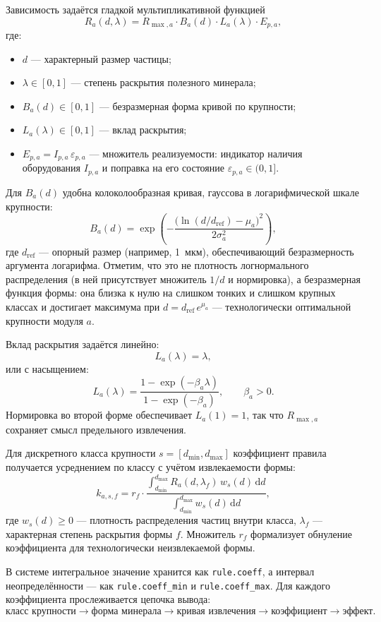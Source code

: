 \documentclass[12pt,a4paper]{article}
\newcommand{\code}[1]{\texttt{#1}}
\newcommand{\dd}{\,\mathrm{d}}
\begin{document}
Зависимость задаётся гладкой мультипликативной функцией
\[
  R_a(d,\lambda) =
  R_{\max,a} \cdot B_a(d) \cdot L_a(\lambda) \cdot E_{p,a},
\]
где:
\begin{itemize}
  \item \(d\) --- характерный размер частицы;
  \item \(\lambda \in [0,1]\) --- степень раскрытия полезного минерала;
  \item \(B_a(d) \in [0,1]\) --- безразмерная форма кривой по крупности;
  \item \(L_a(\lambda) \in [0,1]\) --- вклад раскрытия;
  \item \(E_{p,a} = I_{p,a}\,\varepsilon_{p,a}\) --- множитель реализуемости:
    индикатор наличия оборудования \(I_{p,a}\) и поправка на его состояние
    \(\varepsilon_{p,a} \in (0,1]\).
\end{itemize}

Для \(B_a(d)\) удобна колоколообразная кривая, гауссова в логарифмической
шкале крупности:
\[
  B_a(d) =
  \exp\!\left(
    -\frac{\bigl(\ln (d/d_{\mathrm{ref}}) - \mu_a\bigr)^2}{2\sigma_a^2}
  \right),
\]
где \(d_{\mathrm{ref}}\) --- опорный размер (например, 1~мкм), обеспечивающий
безразмерность аргумента логарифма. Отметим, что это не плотность
логнормального распределения (в ней присутствует множитель \(1/d\) и
нормировка), а безразмерная функция формы: она близка к нулю на слишком тонких
и слишком крупных классах и достигает максимума при
\(d = d_{\mathrm{ref}}\, e^{\mu_a}\) --- технологически оптимальной крупности
модуля \(a\).

Вклад раскрытия задаётся линейно:
\[
  L_a(\lambda) = \lambda,
\]
или с насыщением:
\[
  L_a(\lambda) = \frac{1 - \exp(-\beta_a \lambda)}{1 - \exp(-\beta_a)},
  \qquad \beta_a > 0.
\]
Нормировка во второй форме обеспечивает \(L_a(1) = 1\), так что
\(R_{\max,a}\) сохраняет смысл предельного извлечения.

Для дискретного класса крупности \(s = [d_{\min}, d_{\max}]\) коэффициент
правила получается усреднением по классу с учётом извлекаемости формы:
\[
  k_{a,s,f} =
  r_f \cdot
  \frac{
    \int_{d_{\min}}^{d_{\max}} R_a(d,\lambda_f)\, w_s(d)\dd d
  }{
    \int_{d_{\min}}^{d_{\max}} w_s(d)\dd d
  },
\]
где \(w_s(d) \ge 0\) --- плотность распределения частиц внутри класса,
\(\lambda_f\) --- характерная степень раскрытия формы \(f\). Множитель
\(r_f\) формализует обнуление коэффициента для технологически неизвлекаемой
формы.

\begin{mainbox}
В системе интегральное значение хранится как \code{rule.coeff}, а интервал
неопределённости --- как \code{rule.coeff\_min} и \code{rule.coeff\_max}.
Для каждого коэффициента прослеживается цепочка вывода:
\[
  \text{класс крупности}
  \to
  \text{форма минерала}
  \to
  \text{кривая извлечения}
  \to
  \text{коэффициент}
  \to
  \text{эффект}.
\]
\end{mainbox}
\end{document}

